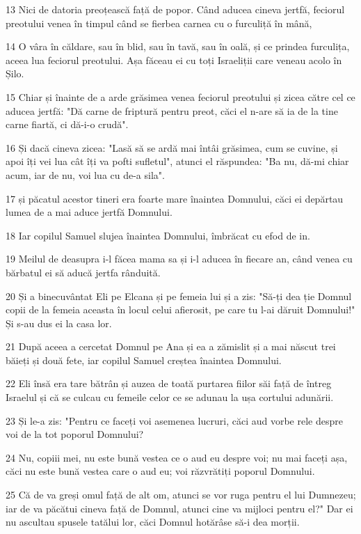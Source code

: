 \par 13 Nici de datoria preoțească față de popor. Când aducea cineva jertfă, feciorul preotului venea în timpul când se fierbea carnea cu o furculiță în mână,
\par 14 O vâra în căldare, sau în blid, sau în tavă, sau în oală, și ce prindea furculița, aceea lua feciorul preotului. Așa făceau ei cu toți Israeliții care veneau acolo în Șilo.
\par 15 Chiar și înainte de a arde grăsimea venea feciorul preotului și zicea către cel ce aducea jertfă: "Dă carne de friptură pentru preot, căci el n-are să ia de la tine carne fiartă, ci dă-i-o crudă".
\par 16 Și dacă cineva zicea: "Lasă să se ardă mai întâi grăsimea, cum se cuvine, și apoi îți vei lua cât îți va pofti sufletul", atunci el răspundea: "Ba nu, dă-mi chiar acum, iar de nu, voi lua cu de-a sila".
\par 17 și păcatul acestor tineri era foarte mare înaintea Domnului, căci ei depărtau lumea de a mai aduce jertfă Domnului.
\par 18 Iar copilul Samuel slujea înaintea Domnului, îmbrăcat cu efod de in.
\par 19 Meilul de deasupra i-l făcea mama sa și i-l aducea în fiecare an, când venea cu bărbatul ei să aducă jertfa rânduită.
\par 20 Și a binecuvântat Eli pe Elcana și pe femeia lui și a zis: "Să-ți dea ție Domnul copii de la femeia aceasta în locul celui afierosit, pe care tu l-ai dăruit Domnului!" Și s-au dus ei la casa lor.
\par 21 După aceea a cercetat Domnul pe Ana și ea a zămislit și a mai născut trei băieți și două fete, iar copilul Samuel creștea înaintea Domnului.
\par 22 Eli însă era tare bătrân și auzea de toată purtarea fiilor săi față de întreg Israelul și că se culcau cu femeile celor ce se adunau la ușa cortului adunării.
\par 23 Și le-a zis: "Pentru ce faceți voi asemenea lucruri, căci aud vorbe rele despre voi de la tot poporul Domnului?
\par 24 Nu, copiii mei, nu este bună vestea ce o aud eu despre voi; nu mai faceți așa, căci nu este bună vestea care o aud eu; voi răzvrătiți poporul Domnului.
\par 25 Că de va greși omul față de alt om, atunci se vor ruga pentru el lui Dumnezeu; iar de va păcătui cineva față de Domnul, atunci cine va mijloci pentru el?" Dar ei nu ascultau spusele tatălui lor, căci Domnul hotărâse să-i dea morții.
